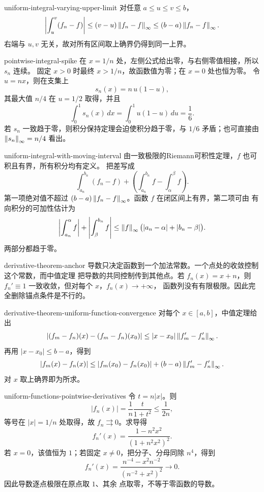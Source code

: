 \begin{solution}{uniform-integral-varying-upper-limit}
对任意 \(a\le u\le v\le b\)，
\[
 \left|\int_u^v(f_n-f)\right|
 \le(v-u)\left\lVert f_n-f\right\rVert_\infty
 \le(b-a)\left\lVert f_n-f\right\rVert_\infty.
\]
右端与 \(u,v\) 无关，故对所有区间取上确界仍得到同一上界。
\end{solution}

\begin{solution}{pointwise-integral-spike}
在 \(x=1/n\) 处，左侧公式给出零，与右侧零值相接，所以 \(s_n\) 连续。
固定 \(x>0\) 时最终 \(x>1/n\)，故函数值为零；在 \(x=0\) 处也恒为零。
令 \(u=nx\)，则在支集上
\[
 s_n(x)=n\,u(1-u),
\]
其最大值 \(n/4\) 在 \(u=1/2\) 取得，并且
\[
 \int_0^1s_n(x)\,dx
 =\int_0^1u(1-u)\,du=\frac16.
\]
若 \(s_n\) 一致趋于零，则积分保持定理会迫使积分趋于零，与 \(1/6\)
矛盾；也可直接由 \(\left\lVert s_n\right\rVert_\infty=n/4\) 看出。
\end{solution}

\begin{solution}{uniform-integral-with-moving-interval}
由一致极限的Riemann可积性定理，\(f\) 也可积且有界，所有积分均有定义。
把差写成
\[
 \int_{a_n}^{b_n}(f_n-f)
 +\left(\int_{a_n}^{b_n}f-\int_\alpha^\beta f\right).
\]
第一项绝对值不超过
\((b-a)\left\lVert f_n-f\right\rVert_\infty\)。函数 \(f\) 在闭区间上有界，第二项可由
有向积分的可加性估计为
\[
 \left|\int_{a_n}^{\alpha}f\right|
 +\left|\int_{\beta}^{b_n}f\right|
 \le\left\lVert f\right\rVert_\infty\bigl(|a_n-\alpha|+|b_n-\beta|\bigr).
\]
两部分都趋于零。
\end{solution}

\begin{solution}{derivative-theorem-anchor}
导数只决定函数到一个加法常数。一个点处的收敛控制这个常数，而中值定理
把导数的共同控制传到其他点。若 \(f_n(x)=x+n\)，则
\(f_n'\equiv1\) 一致收敛，但对每个 \(x\)，\(f_n(x)\to+\infty\)，
函数列没有有限极限。因此完全删除锚点条件是不行的。
\end{solution}

\begin{solution}{derivative-theorem-uniform-function-convergence}
对每个 \(x\in[a,b]\)，中值定理给出
\[
 |(f_m-f_n)(x)-(f_m-f_n)(x_0)|
 \le |x-x_0|\left\lVert f_m'-f_n'\right\rVert_\infty.
\]
再用 \(|x-x_0|\le b-a\)，得到
\[
 |f_m(x)-f_n(x)|
 \le |f_m(x_0)-f_n(x_0)|
 +(b-a)\left\lVert f_m'-f_n'\right\rVert_\infty.
\]
对 \(x\) 取上确界即为所求。
\end{solution}

\begin{solution}{uniform-functions-pointwise-derivatives}
令 \(t=n|x|\)。则
\[
 |f_n(x)|=\frac1n\frac{t}{1+t^2}\le\frac1{2n},
\]
等号在 \(|x|=1/n\) 处取得，故 \(f_n\rightrightarrows0\)。求导得
\[
 f_n'(x)=\frac{1-n^2x^2}{(1+n^2x^2)^2}.
\]
若 \(x=0\)，该值恒为 \(1\)；若固定 \(x\ne0\)，把分子、分母同除
\(n^4\)，得到
\[
 f_n'(x)=\frac{n^{-4}-x^2n^{-2}}{(n^{-2}+x^2)^2}\longrightarrow0.
\]
因此导数逐点极限在原点取 \(1\)、其余
点取零，不等于零函数的导数。
\end{solution}

